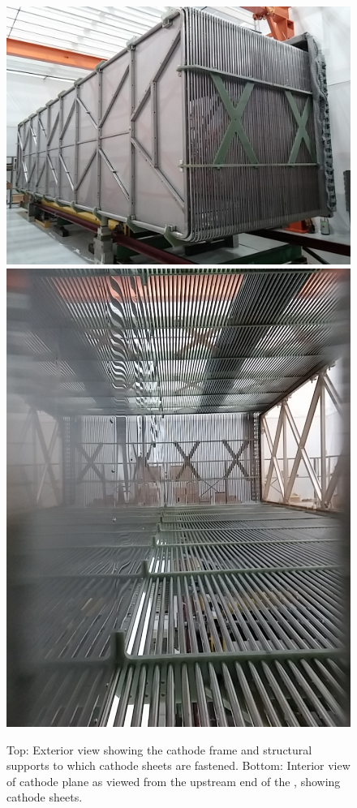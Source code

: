 \begin{figure}[htb]
\centering	
\includegraphics[width=0.62\linewidth]{figures/tpc-completed-upstream-left.jpg}
\includegraphics[width=0.62\linewidth]{figures/tpc-upstream-interior.jpg}
\caption{Top: Exterior view showing the cathode frame and structural supports to which cathode sheets are fastened.  Bottom: Interior view of cathode plane as viewed from the upstream end of the \lartpc, showing cathode sheets.}
\label{fig:tpc-cathode}
\end{figure}


